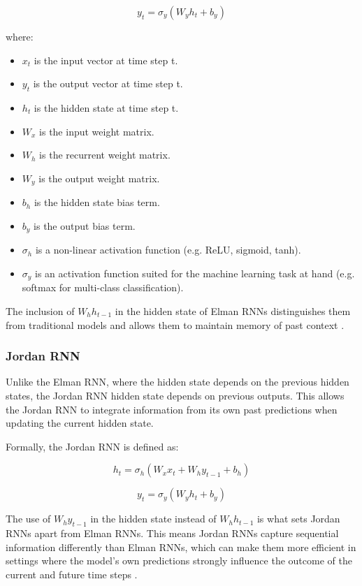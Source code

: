 \documentclass[conference]{IEEEtran}
\begin{document}
$$
y_t = \sigma_y(W_y h_t + b_y)
$$

where:

\begin{itemize}
    \item $x_t$ is the input vector at time step t.
    \item $y_t$ is the output vector at time step t.
    \item $h_t$ is the hidden state at time step t.
    \item $W_x$ is the input weight matrix.
    \item $W_h$ is the recurrent weight matrix.
    \item $W_y$ is the output weight matrix.
    \item $b_h$ is the hidden state bias term.
    \item $b_y$ is the output bias term.
    \item $\sigma_h$ is a non-linear activation function (e.g. ReLU, sigmoid, tanh).
    \item $\sigma_y$ is an activation function suited for the machine learning task at hand (e.g. softmax for multi-class classification).
\end{itemize}

The inclusion of $W_h h_{t-1}$ in the hidden state of Elman RNNs distinguishes them from traditional models and allows them to maintain memory of past context \cite{elman_rnn}.

\subsubsection{\textbf{Jordan RNN}}

Unlike the Elman RNN, where the hidden state depends on the previous hidden states, the Jordan RNN hidden state depends on previous outputs. This allows the Jordan RNN to integrate information from its own past predictions when updating the current hidden state.

Formally, the Jordan RNN is defined as:

$$
h_t = \sigma_h(W_x x_t + W_h y_{t-1} + b_h)
$$

$$
y_t = \sigma_y(W_y h_t + b_y)
$$

The use of $W_h y_{t-1}$ in the hidden state instead of $W_h h_{t-1}$ is what sets Jordan RNNs apart from Elman RNNs. This means Jordan RNNs capture sequential information differently than Elman RNNs, which can make them more efficient in settings where the model's own predictions strongly influence the outcome of the current and future time steps \cite{jordan_rnn}.
\end{document}
